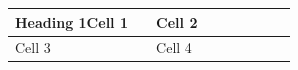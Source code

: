 \par\medskip
\begin{longtable}{|p{0.45\linewidth}|p{0.45\linewidth}|}
\hline
Heading 1Cell 1

 & Cell 2

 \\
\hline
Cell 3

 & Cell 4

 \\
\hline
\end{longtable}
\medskip


